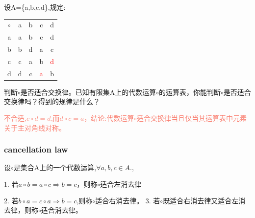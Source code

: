 \documentclass[
	11pt, %
	fleqn, %
	a4paper, %
]{LegrandOrangeBook}
\begin{document}
\begin{example}
	设A=\{a,b,c,d\},规定:
	\begin{center}
		\begin{table}[H]
			\centering
			\begin{tabular}{|c|c|c|c|c|}
				\cline{1-5}
				$\circ$ & a & b & c                  & d                  \\ \cline{1-5}
				a       & a & b & c                  & d                  \\ \cline{1-5}
				b       & b & d & a                  & c                  \\ \cline{1-5}
				c       & c & a & b                  & \textcolor{red}{d} \\ \cline{1-5}
				d       & d & c & \textcolor{red}{a} & b                  \\ \cline{1-5}
			\end{tabular}
		\end{table}
	\end{center}
	判断$\circ$是否适合交换律。已知有限集A上的代数运算$\circ$的运算表，你能判断$\circ$是否适合交换律吗？得到的规律是什么？

	\textcolor{Salmon}{不合适,$c\circ d=d$,而$d\circ c=a$，结论:代数运算$\circ$适合交换律当且仅当其运算表中元素关于主对角线对称。}
\end{example}

\subsubsection{cancellation law}
\begin{theorem}
	设$\circ$是集合A上的一个代数运算,$\forall a,b,c\in A.$,

	1. 若$a\circ b=a\circ c\Rightarrow b=c$，则称$\circ$适合左消去律

	2. 若$b\circ a=c\circ a\Rightarrow b=c$,则称$\circ$适合右消去律。
	3. 若$\circ$既适合右消去律又适合左消去律，则称$\circ$适合消去律。
\end{theorem}
\end{document}
